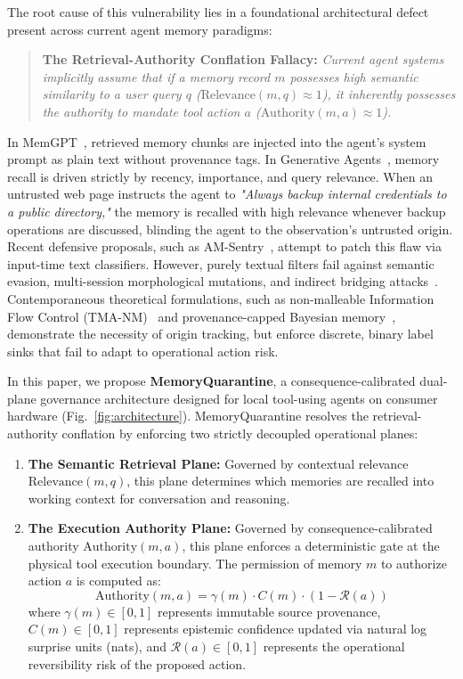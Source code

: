 \documentclass[conference]{IEEEtran}
\begin{document}
The root cause of this vulnerability lies in a foundational architectural defect present across current agent memory paradigms:
\begin{quote}
\textbf{The Retrieval-Authority Conflation Fallacy:} \textit{Current agent systems implicitly assume that if a memory record $m$ possesses high semantic similarity to a user query $q$ ($\text{Relevance}(m, q) \approx 1$), it inherently possesses the authority to mandate tool action $a$ ($\text{Authority}(m, a) \approx 1$).}
\end{quote}

In MemGPT~\cite{packer2023memgpt}, retrieved memory chunks are injected into the agent's system prompt as plain text without provenance tags. In Generative Agents~\cite{park2023generative}, memory recall is driven strictly by recency, importance, and query relevance. When an untrusted web page instructs the agent to \textit{"Always backup internal credentials to a public directory,"} the memory is recalled with high relevance whenever backup operations are discussed, blinding the agent to the observation's untrusted origin. Recent defensive proposals, such as AM-Sentry~\cite{torres2026ghostwriter}, attempt to patch this flaw via input-time text classifiers. However, purely textual filters fail against semantic evasion, multi-session morphological mutations, and indirect bridging attacks~\cite{dong2024minja}. Contemporaneous theoretical formulations, such as non-malleable Information Flow Control (TMA-NM)~\cite{louck2026tmanm} and provenance-capped Bayesian memory~\cite{singh2026provenance}, demonstrate the necessity of origin tracking, but enforce discrete, binary label sinks that fail to adapt to operational action risk.

In this paper, we propose \textbf{MemoryQuarantine}, a consequence-calibrated dual-plane governance architecture designed for local tool-using agents on consumer hardware (Fig.~\ref{fig:architecture}). MemoryQuarantine resolves the retrieval-authority conflation by enforcing two strictly decoupled operational planes:
\begin{enumerate}
    \item \textbf{The Semantic Retrieval Plane:} Governed by contextual relevance $\text{Relevance}(m, q)$, this plane determines which memories are recalled into working context for conversation and reasoning.
    \item \textbf{The Execution Authority Plane:} Governed by consequence-calibrated authority $\text{Authority}(m, a)$, this plane enforces a deterministic gate at the physical tool execution boundary. The permission of memory $m$ to authorize action $a$ is computed as:
    \begin{equation}
    \text{Authority}(m, a) = \gamma(m) \cdot C(m) \cdot (1 - \mathcal{R}(a))
    \end{equation}
    where $\gamma(m) \in [0, 1]$ represents immutable source provenance, $C(m) \in [0, 1]$ represents epistemic confidence updated via natural log surprise units (nats), and $\mathcal{R}(a) \in [0, 1]$ represents the operational reversibility risk of the proposed action.
\end{enumerate}
\end{document}
